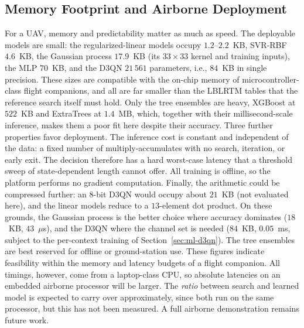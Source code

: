 \documentclass[correspondence]{IEEEtaes}
\begin{document}
\subsection{Memory Footprint and Airborne Deployment}
\label{sec:deploy}
For a UAV, memory and predictability matter as much as speed. The deployable models are
small: the regularized-linear models occupy $1.2$--$2.2$~KB, SVR-RBF $4.6$~KB, the Gaussian
process $17.9$~KB (its $33\times33$ kernel and training inputs), the MLP $70$~KB, and the
D3QN $21\,561$ parameters, i.e., $84$~KB in single precision. These sizes are compatible
with the on-chip memory of microcontroller-class flight companions, and all are far
smaller than the LBLRTM tables that the reference search itself must hold. Only the tree
ensembles are heavy, XGBoost at $522$~KB and ExtraTrees at $1.4$~MB, which, together with
their millisecond-scale inference, makes them a poor fit here despite their accuracy.
Three further properties favor deployment. The inference cost is constant and independent
of the data: a fixed number of multiply-accumulates with no search, iteration, or early
exit. The decision therefore has a hard worst-case latency that a threshold sweep of
state-dependent length cannot offer. All training is offline, so the platform performs no
gradient computation. Finally, the arithmetic
could be compressed further: an $8$-bit D3QN would occupy about $21$~KB (not evaluated
here), and the linear models reduce to
a $13$-element dot product. On these grounds, the Gaussian process is the better choice
where accuracy dominates ($18$~KB, $43$~$\mu$s), and the D3QN where the channel set is
needed ($84$~KB, $0.05$~ms, subject to the per-context training of
Section~\ref{sec:ml-d3qn}). The tree ensembles are best reserved for offline or
ground-station use. These figures indicate feasibility within the memory and latency
budgets of a flight companion. All timings, however, come from a laptop-class CPU, so
absolute latencies on an embedded airborne processor will be larger. The \emph{ratio}
between search and learned model is expected to carry over approximately, since both run
on the same processor, but this has not been measured. A full airborne demonstration
remains future work.
\end{document}
